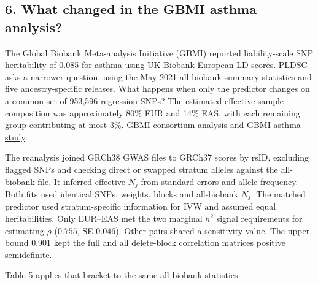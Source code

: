 \documentclass[11pt,a4paper]{article}
\let\reportsection\subsection
\newif\ifinsupplement
\renewcommand{\subsection}[1]{\clearpage
  \ifstrequal{#1}{Supplementary Methods}{\insupplementtrue
    \fancyhead[R]{\small\sffamily Supplementary methods}}{}
  \reportsection{#1}}
\begin{document}
\subsection{6. What changed in the GBMI asthma analysis?}\label{6-what-changed-in-the-gbmi-asthma-analysis}

The Global Biobank Meta-analysis Initiative (GBMI) reported liability-scale SNP heritability of 0.085 for asthma using UK Biobank European LD scores. PLDSC asks a narrower question, using the May 2021 all-biobank summary statistics and five ancestry-specific releases. What happens when only the predictor changes on a common set of 953,596 regression SNPs? The estimated effective-sample composition was approximately 80\% EUR and 14\% EAS, with each remaining group contributing at most 3\%. \href{https://doi.org/10.1016/j.xgen.2022.100192}{GBMI consortium analysis} and \href{https://doi.org/10.1016/j.xgen.2022.100212}{GBMI asthma study}.

The reanalysis joined GRCh38 GWAS files to GRCh37 scores by rsID, excluding flagged SNPs and checking direct or swapped stratum alleles against the all-biobank file. It inferred effective \(N_j\) from standard errors and allele frequency. Both fits used identical SNPs, weights, blocks and all-biobank \(N_j\). The matched predictor used stratum-specific information for IVW and assumed equal heritabilities. Only EUR--EAS met the two marginal \(h^2\) signal requirements for estimating \(\rho\) (\(0.755\), SE \(0.046\)). Other pairs shared a sensitivity value. The upper bound 0.901 kept the full and all delete-block correlation matrices positive semidefinite.

Table 5 applies that bracket to the same all-biobank statistics.
\end{document}
